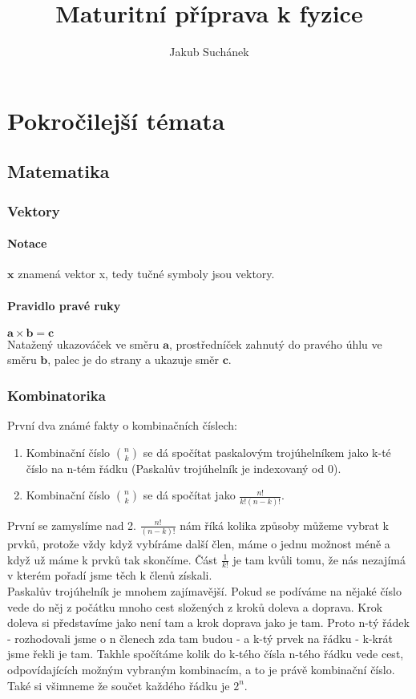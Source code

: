 \documentclass[titlepage]{report}
\title{Maturitní příprava k fyzice}
\author{Jakub Suchánek}
\date{ }
\begin{document}
\maketitle
\tableofcontents{}

\part{Pokročilejší témata}
\chapter{Matematika}
\section{Vektory}
\subsection{Notace}
$\boldsymbol x$ znamená vektor x, tedy tučné symboly jsou vektory.
\subsection{Pravidlo pravé ruky}
$\boldsymbol a \times \boldsymbol b = \boldsymbol c$\\
Natažený ukazováček ve směru $\boldsymbol a$, prostředníček zahnutý do pravého úhlu ve směru $\boldsymbol b$, palec je do strany a ukazuje směr $\boldsymbol c$. 
\section{Kombinatorika}
První dva známé fakty o kombinačních číslech:\\
\begin{enumerate}
\item Kombinační číslo $\binom{n}{k}$ se dá spočítat paskalovým trojúhelníkem jako k-té číslo na n-tém řádku (Paskalův trojúhelník je indexovaný od 0).
\item Kombinační číslo $\binom{n}{k}$ se dá spočítat jako $\frac{n!}{k!(n-k)!}$.
\end{enumerate}
První se zamyslíme nad 2. $\frac{n!}{(n-k)!}$ nám říká kolika způsoby můžeme vybrat k prvků, protože vždy když vybíráme další člen, máme o jednu možnost méně a když už máme k prvků tak skončíme. Část $\frac{1}{k!}$ je tam kvůli tomu, že nás nezajímá v kterém pořadí jsme těch k členů získali.\\
Paskalův trojúhelník je mnohem zajímavější. Pokud se podíváme na nějaké číslo vede do něj z počátku mnoho cest složených z kroků doleva a doprava. Krok doleva si představíme jako není tam a krok doprava jako je tam. Proto n-tý řádek - rozhodovali jsme o n členech zda tam budou - a k-tý prvek na řádku - k-krát jsme řekli je tam. Takhle spočítáme kolik do k-tého čísla n-tého řádku vede cest, odpovídajících možným vybraným kombinacím, a to je právě kombinační číslo. Také si všimneme že součet každého řádku je $2^n$.
\end{document}
